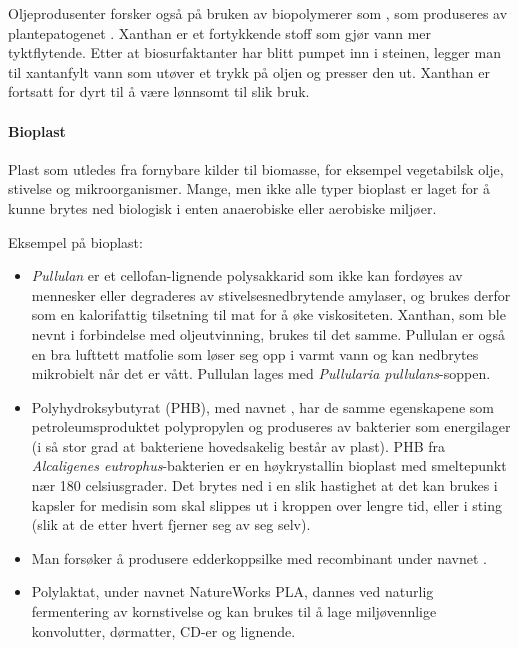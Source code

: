 Oljeprodusenter forsker også på bruken av biopolymerer som , som produseres av plantepatogenet . Xanthan er et fortykkende stoff som gjør vann mer tyktflytende. Etter at biosurfaktanter har blitt pumpet inn i steinen, legger man til xantanfylt vann som utøver et trykk på oljen og presser den ut. Xanthan er fortsatt for dyrt til å være lønnsomt til slik bruk.

\paragraph{Bioplast} Plast som utledes fra fornybare kilder til biomasse, for eksempel vegetabilsk olje, stivelse og mikroorganismer. Mange, men ikke alle typer bioplast er laget for å kunne brytes ned biologisk i enten anaerobiske eller aerobiske miljøer. 

Eksempel på bioplast:
\begin{itemize}[nolistsep,noitemsep]
	\item {}\emph{Pullulan} er et cellofan-lignende polysakkarid som ikke kan fordøyes av mennesker eller degraderes av stivelsesnedbrytende amylaser, og brukes derfor som en kalorifattig tilsetning til mat for å øke viskositeten. Xanthan, som ble nevnt i forbindelse med oljeutvinning, brukes til det samme. Pullulan er også en bra lufttett matfolie som løser seg opp i varmt vann og kan nedbrytes mikrobielt når det er vått. Pullulan lages med \emph{Pullularia pullulans}-soppen.
	\item Polyhydroksybutyrat (PHB), med navnet , har de samme egenskapene som petroleumsproduktet polypropylen og produseres av bakterier som energilager (i så stor grad at bakteriene hovedsakelig består av plast). PHB fra \emph{Alcaligenes eutrophus}-bakterien er en høykrystallin bioplast med smeltepunkt nær 180 celsiusgrader. Det brytes ned i en slik hastighet at det kan brukes i kapsler for medisin som skal slippes ut i kroppen over lengre tid, eller i sting (slik at de etter hvert fjerner seg av seg selv).
	\item Man forsøker å produsere edderkoppsilke med recombinant  under navnet .
	\item {}Polylaktat, under navnet NatureWorks PLA, dannes ved naturlig fermentering av kornstivelse og kan brukes til å lage miljøvennlige konvolutter, dørmatter, CD-er og lignende. 
\end{itemize}
